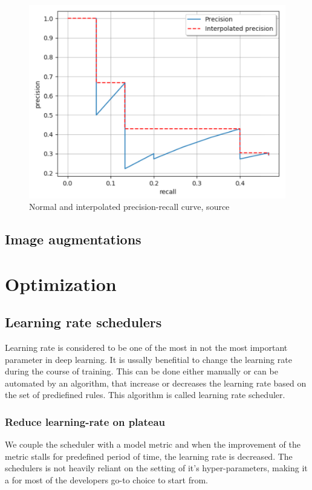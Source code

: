 \begin{figure}
    \includegraphics[width = \linewidth]{images/PR-curve.png}
    \caption{Normal and interpolated precision-recall curve, source \cite{Padilla2020}}
    \label{fig:pr_curve}
\end{figure}


\subsection{Image augmentations}


\section{Optimization}
\subsection{Learning rate schedulers}
Learning rate is considered to be one of the most in not the most important parameter in deep learning. It is ussally benefitial to change the learning rate during the course of training. This can be done either manually or can be automated by an algorithm, that increase or decreases the learning rate based on the set of prediefined rules. This algorithm is called learning rate scheduler.

\subsubsection{Reduce learning-rate on plateau}
We couple the scheduler with a model metric and when the improvement of the metric stalls for predefined period of time, the learning rate is decreased.
The schedulers is not heavily reliant on the setting of it's hyper-parameters, making it a for most of the developers go-to choice to start from.



